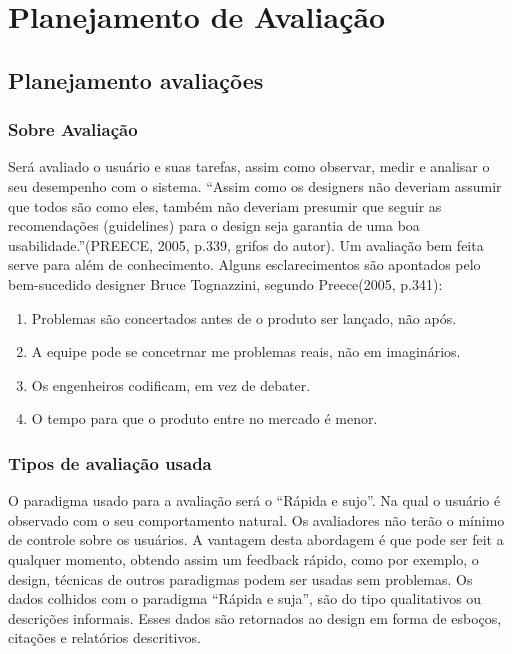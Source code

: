 \chapter[Planejamento_Avaliacoes]{Planejamento de Avaliação}

\section{Planejamento avaliações}

\subsection{Sobre Avaliação}

	Será avaliado o usuário e suas tarefas, assim como observar, medir e analisar o seu desempenho com o sistema. 
	“Assim como os designers não deveriam assumir que todos são como eles, também não deveriam presumir que seguir as recomendações (guidelines) para o design seja garantia de uma boa usabilidade.”(PREECE, 2005, p.339, grifos do autor).
	Um avaliação bem feita serve para além de conhecimento. Alguns esclarecimentos são apontados pelo bem-sucedido designer Bruce Tognazzini, segundo Preece(2005, p.341):

\begin{enumerate}
	\item Problemas são concertados antes de o produto ser lançado, não após.
	\item A equipe pode se concetrnar me problemas reais, não em imaginários.
	\item Os engenheiros codificam, em vez de debater.
	\item O tempo para que o produto entre no mercado é menor.
\end{enumerate}

\subsection{Tipos de avaliação usada}

	O paradigma usado para a avaliação será o “Rápida e sujo”. Na qual o usuário é observado com o seu comportamento natural. Os avaliadores não terão o mínimo de controle sobre os usuários. A vantagem desta abordagem é que pode ser feit a qualquer momento, obtendo assim um feedback rápido, como por exemplo, o design, técnicas de outros paradigmas podem ser usadas sem problemas. 
	Os dados colhidos com o paradigma “Rápida e suja”, são do tipo qualitativos ou descrições informais. Esses dados são retornados ao design em forma de esboços, citações e relatórios descritivos.

